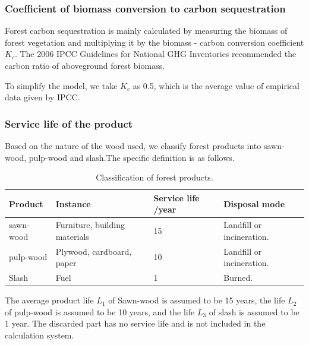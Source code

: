 \subsubsection{Coefficient of biomass conversion to carbon sequestration}
Forest carbon sequestration is mainly calculated by measuring the biomass of forest vegetation and multiplying it by the biomass - carbon conversion coefficient $K_c$. The 2006 IPCC Guidelines for National GHG Inventories recommended the carbon ratio of aboveground forest biomass. 

To simplify the model, we take $K_c$ as 0.5, which is the average value of empirical data given by IPCC.


\subsubsection{Service life of the product}

Based on the nature of the wood used, we classify forest products into sawn-wood, pulp-wood and slash.The specific definition is as follows.

\begin{table}[htp]
\caption{Classification of forest products.}
\begin{tabular}{llll} 
\hline
\textbf{Product} & \textbf{Instance}               & \textbf{Service life /year} & \textbf{Disposal mode}                                                                                          \\ 
\hline
sawn-wood        & Furniture,
  building materials & 15                          & Landfill or incineration.                                                   \\
pulp-wood        & Plywood,
  cardboard, paper     & 10~                         & Landfill or incineration. \\
Slash            & Fuel                            & 1                           & Burned.                                                                                                         \\
\hline
\end{tabular}
\end{table}

The average product life $L_1$ of Sawn-wood is assumed to be 15 years, the life $L_2$ of pulp-wood is assumed to be 10 years, and the life $L_3$ of slash is assumed to be 1 year. The discarded part has no service life and is not included in the calculation system.

